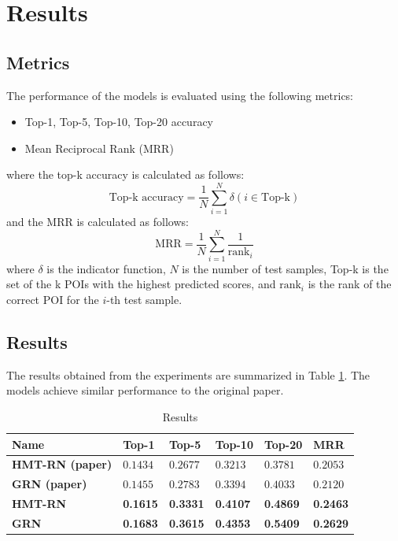 \documentclass[twocolumn,twoside]{article}
\begin{document}
\section{Results}
\subsection{Metrics}
The performance of the models is evaluated using the following metrics:
\begin{itemize}
  \item Top-1, Top-5, Top-10, Top-20 accuracy
  \item Mean Reciprocal Rank (MRR)
\end{itemize}
where the top-k accuracy is calculated as follows:
\begin{equation}
  \text{Top-k accuracy} = \frac{1}{N} \sum_{i=1}^{N} \delta(i \in \text{Top-k})
\end{equation}
and the MRR is calculated as follows:
\begin{equation}
  \text{MRR} = \frac{1}{N} \sum_{i=1}^{N} \frac{1}{\text{rank}_i}
\end{equation}
where $\delta$ is the indicator function, $N$ is the number of test samples, Top-k is the set of the k
POIs with the highest predicted scores,
and $\text{rank}_i$ is the rank of the correct POI for the $i$-th test sample.
\subsection{Results}
The results obtained from the experiments are summarized in Table \ref{tab:results}.
The models achieve similar performance to the original paper.
\begin{table}
  \caption{Results}
  \centering
  \begin{tabular}{p{1.55cm}lllll}
    \toprule
    Name & Top-1 & Top-5 & Top-10 & Top-20 & MRR \\
    \midrule
    \midrule
    \textbf{HMT-RN (paper)}\cite{main_paper}\newline & $0.1434$ & $0.2677$ & $0.3213$ & $0.3781$ & $0.2053$ \\
    \textbf{GRN \newline (paper)}\cite{main_paper} & $0.1455$ & $0.2783$ & $0.3394$ & $0.4033$ & $0.2120$ \\
    \midrule
    \midrule
    \textbf{HMT-RN} & \textbf{0.1615} & \textbf{0.3331} & \textbf{0.4107} & \textbf{0.4869} & \textbf{0.2463} \\
    \textbf{GRN} & \textbf{0.1683} & \textbf{0.3615} & \textbf{0.4353} & \textbf{0.5409} & \textbf{0.2629} \\
    \bottomrule
  \end{tabular}
  \label{tab:results}
\end{table}
\end{document}
